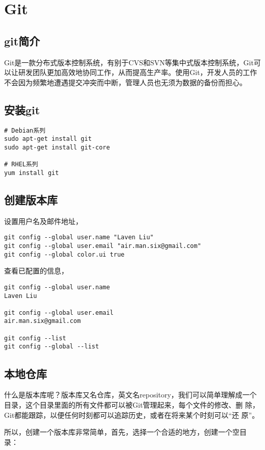 \chapter{Git}

\section{git简介}

Git是一款分布式版本控制系统，有别于CVS和SVN等集中式版本控制系统，Git可
以让研发团队更加高效地协同工作，从而提高生产率。使用Git，开发人员的工作
不会因为频繁地遭遇提交冲突而中断，管理人员也无须为数据的备份而担心。

\section{安装git}

\begin{verbatim}
# Debian系列
sudo apt-get install git
sudo apt-get install git-core

# RHEL系列
yum install git
\end{verbatim}

\section{创建版本库}
设置用户名及邮件地址，
\begin{verbatim}
git config --global user.name "Laven Liu"
git config --global user.email "air.man.six@gmail.com"
git config --global color.ui true
\end{verbatim}

查看已配置的信息，
\begin{verbatim}
git config --global user.name
Laven Liu

git config --global user.email
air.man.six@gmail.com

git config --list
git config --global --list
\end{verbatim}

\section{本地仓库}

什么是版本库呢？版本库又名仓库，英文名repository，我们可以简单理解成一个
目录，这个目录里面的所有文件都可以被Git管理起来，每个文件的修改、删
除，Git都能跟踪，以便任何时刻都可以追踪历史，或者在将来某个时刻可以“还
原”。

所以，创建一个版本库非常简单，首先，选择一个合适的地方，创建一个空目
录：

